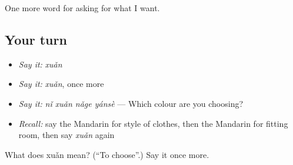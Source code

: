\begin{grammarlens}[title={What you've built}]
One more word for asking for what I want.
\end{grammarlens}

\subsection*{Your turn}
\begin{itemize}
\raggedright
  \item \emph{Say it:} \emph{xuǎn}
  \item \emph{Say it:} \emph{xuǎn}, once more
  \item \emph{Say it:} \emph{nǐ xuǎn nǎge yánsè} — Which colour are you choosing?
  \item \emph{Recall:} say the Mandarin for style of clothes, then the Mandarin for fitting room, then say \emph{xuǎn} again
\end{itemize}

\begin{tcolorbox}[breakable,colback=teal!4,colframe=teal!35!black,title={Before you move on}]
What does xuǎn mean? (\textquotedblleft{}To choose\textquotedblright{}.) Say it once more.
\end{tcolorbox}
